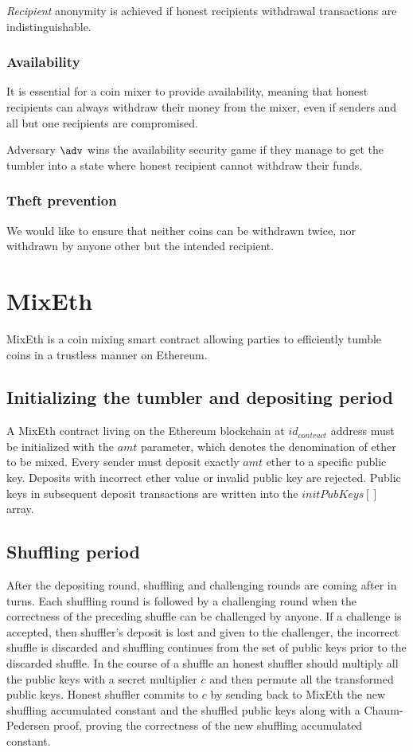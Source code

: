 \documentclass[a4paper,UKenglish,cleveref, autoref]{oasics-v2019}
\begin{document}
\textit{Recipient} anonymity is achieved if honest recipients withdrawal transactions are indistinguishable. 

\subsubsection{Availability}
It is essential for a coin mixer to provide availability, meaning that honest recipients can always withdraw their money from the mixer, even if senders and all but one recipients are compromised. 

Adversary $\adv$ wins the availability security game if they manage to get the tumbler into a state where honest recipient cannot withdraw their funds.

\subsubsection{Theft prevention} \label{sec:theftprevention}
We would like to ensure that neither coins can be withdrawn twice, nor withdrawn by anyone other but the intended recipient.

\section{MixEth}

MixEth is a coin mixing smart contract allowing parties to efficiently tumble coins in a trustless manner on Ethereum.
\subsection{Initializing the tumbler and depositing period}

A MixEth contract living on the Ethereum blockchain at $id_{contract}$ address must be initialized with the $amt$ parameter, which denotes the denomination of ether to be mixed.
Every sender must deposit exactly $amt$ ether to a specific public key. Deposits with incorrect ether value or invalid public key are rejected. Public keys in subsequent deposit transactions are written into the $initPubKeys[]$ array.   

\subsection{Shuffling period}
After the depositing round, shuffling and challenging rounds are coming after in turns. Each shuffling round is followed by a challenging round when the correctness of the preceding shuffle can be challenged by anyone. If a challenge is accepted, then shuffler's deposit is lost and given to the challenger, the incorrect shuffle is discarded and shuffling continues from the set of public keys prior to the discarded shuffle. In the course of a shuffle an honest shuffler should multiply all the public keys with a secret multiplier $c$ and then permute all the transformed public keys. Honest shuffler commits to $c$ by sending back to MixEth the new shuffling accumulated constant and the shuffled public keys along with a Chaum-Pedersen proof, proving the correctness of the new shuffling accumulated constant.
\end{document}
